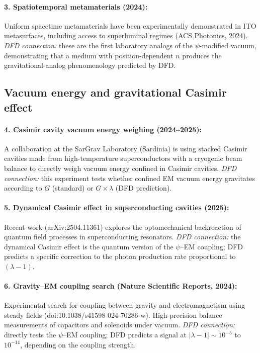 \documentclass[aps,prd,twocolumn,superscriptaddress,nofootinbib]{revtex4-2}
\begin{document}
\paragraph{3. Spatiotemporal metamaterials (2024):}
Uniform spacetime metamaterials have been experimentally demonstrated
in ITO metasurfaces, including access to superluminal regimes
(ACS Photonics, 2024).  \emph{DFD connection:} these are the first
laboratory analogs of the $\psi$-modified vacuum, demonstrating
that a medium with position-dependent $n$ produces the
gravitational-analog phenomenology predicted by DFD\@.

\subsection{Vacuum energy and gravitational Casimir effect}

\paragraph{4. Casimir cavity vacuum energy weighing (2024--2025):}
A collaboration at the SarGrav Laboratory (Sardinia) is using
stacked Casimir cavities made from high-temperature superconductors
with a cryogenic beam balance to directly weigh vacuum energy
confined in Casimir cavities.  \emph{DFD connection:} this experiment
tests whether confined EM vacuum energy gravitates according to
$G$ (standard) or $G \times \lambda$ (DFD prediction).

\paragraph{5. Dynamical Casimir effect in superconducting cavities
(2025):}
Recent work (arXiv:2504.11361) explores the optomechanical
backreaction of quantum field processes in superconducting resonators.
\emph{DFD connection:} the dynamical Casimir effect is the quantum
version of the $\psi$--EM coupling; DFD predicts a specific
correction to the photon production rate proportional to $(\lambda - 1)$.

\paragraph{6. Gravity--EM coupling search (Nature Scientific Reports,
2024):}
Experimental search for coupling between gravity and electromagnetism
using steady fields (doi:10.1038/s41598-024-70286-w).  High-precision
balance measurements of capacitors and solenoids under vacuum.
\emph{DFD connection:} directly tests the $\psi$--EM coupling; DFD
predicts a signal at $|\lambda - 1| \sim 10^{-5}$ to $10^{-14}$,
depending on the coupling strength.
\end{document}
